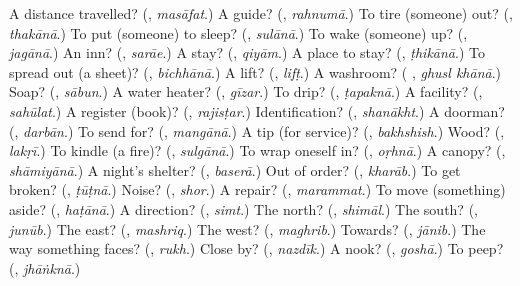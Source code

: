\begin{tcolorbox}[breakable,colback=teal!4,colframe=teal!35!black,title={Before you move on}]
A distance travelled? (\textbf{}, \emph{masāfat}.) A guide? (\textbf{}, \emph{rahnumā}.) To tire (someone) out? (\textbf{}, \emph{thakānā}.) To put (someone) to sleep? (\textbf{}, \emph{sulānā}.) To wake (someone) up? (\textbf{}, \emph{jagānā}.) An inn? (\textbf{}, \emph{sarāe}.) A stay? (\textbf{}, \emph{qiyām}.) A place to stay? (\textbf{}, \emph{ṭhikānā}.) To spread out (a sheet)? (\textbf{}, \emph{bichhānā}.) A lift? (\textbf{}, \emph{lifṭ}.) A washroom? (\textbf{ }, \emph{ghusl khānā}.) Soap? (\textbf{}, \emph{sābun}.) A water heater? (\textbf{}, \emph{gīzar}.) To drip? (\textbf{}, \emph{ṭapaknā}.) A facility? (\textbf{}, \emph{sahūlat}.) A register (book)? (\textbf{}, \emph{rajisṭar}.) Identification? (\textbf{}, \emph{shanākht}.) A doorman? (\textbf{}, \emph{darbān}.) To send for? (\textbf{}, \emph{mangānā}.) A tip (for service)? (\textbf{}, \emph{bakhshish}.) Wood? (\textbf{}, \emph{lakṛī}.) To kindle (a fire)? (\textbf{}, \emph{sulgānā}.) To wrap oneself in? (\textbf{}, \emph{oṛhnā}.) A canopy? (\textbf{}, \emph{shāmiyānā}.) A night's shelter? (\textbf{}, \emph{baserā}.) Out of order? (\textbf{}, \emph{kharāb}.) To get broken? (\textbf{}, \emph{ṭūṭnā}.) Noise? (\textbf{}, \emph{shor}.) A repair? (\textbf{}, \emph{marammat}.) To move (something) aside? (\textbf{}, \emph{haṭānā}.) A direction? (\textbf{}, \emph{simt}.) The north? (\textbf{}, \emph{shimāl}.) The south? (\textbf{}, \emph{junūb}.) The east? (\textbf{}, \emph{mashriq}.) The west? (\textbf{}, \emph{maghrib}.) Towards? (\textbf{}, \emph{jānib}.) The way something faces? (\textbf{}, \emph{rukh}.) Close by? (\textbf{}, \emph{nazdīk}.) A nook? (\textbf{}, \emph{goshā}.) To peep? (\textbf{}, \emph{jhāṅknā}.)
\end{tcolorbox}
